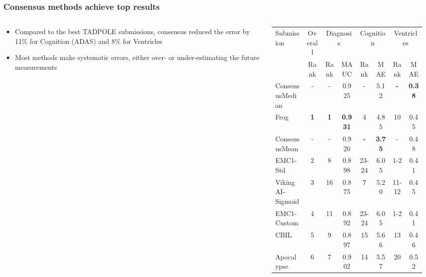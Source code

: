 \documentclass[8pt,xcolor=table,aspectratio=169]{beamer}
\begin{document}
\begin{frame}
\frametitle{Consensus methods achieve top results}


\begin{columns}
\begin{column}[t]{0.5\textwidth}
 \begin{itemize}
 \item Compared to the best TADPOLE submissions, consensus reduced the error by 11\% for Cognition (ADAS) and 8\% for Ventricles
 
 \vspace{2em}
 
 \item Most methods make systematic errors, either over- or under-estimating the future measurements
\end{itemize}
\end{column}
\begin{column}[t]{0.5\textwidth}
 \begin{table}
\centering
 \fontsize{6}{8}\selectfont
\begin{tabular}{lc|cc|cc|cc}
 \Xhline{2.5\arrayrulewidth}
 Submission & Overall & \multicolumn{2}{c|}{Diagnosis} & \multicolumn{2}{c|}{Cognition}  & \multicolumn{2}{c}{Ventricles}\\
                        & Rank &  Rank & MAUC & Rank & MAE & Rank & MAE \\
 \Xhline{2.5\arrayrulewidth}
\rowcolor{winnerCol} ConsensusMedian & - & - & 0.925 & - & 5.12 & \textbf{-} & \textbf{0.38}\\ 
Frog & \textbf{1} & \textbf{1} & \textbf{0.931} & 4 & 4.85 & 10 & 0.45\\ 
\rowcolor{winnerCol} ConsensusMean & - & - & 0.920 & \textbf{-} & \textbf{3.75} & - & 0.48\\ 
EMC1-Std & 2 & 8 & 0.898 & 23-24 & 6.05 & 1-2 & 0.41\\ 
VikingAI-Sigmoid & 3 & 16 & 0.875 & 7 & 5.20 & 11-12 & 0.45\\ 
EMC1-Custom & 4 & 11 & 0.892 & 23-24 & 6.05 & 1-2 & 0.41\\ 
CBIL & 5 & 9 & 0.897 & 15 & 5.66 & 13 & 0.46\\ 
Apocalypse & 6 & 7 & 0.902 & 14 & 5.57 & 20 & 0.52\\ 

\end{tabular}
\end{table}
\end{column}
\end{columns}
\end{frame}
\end{document}
